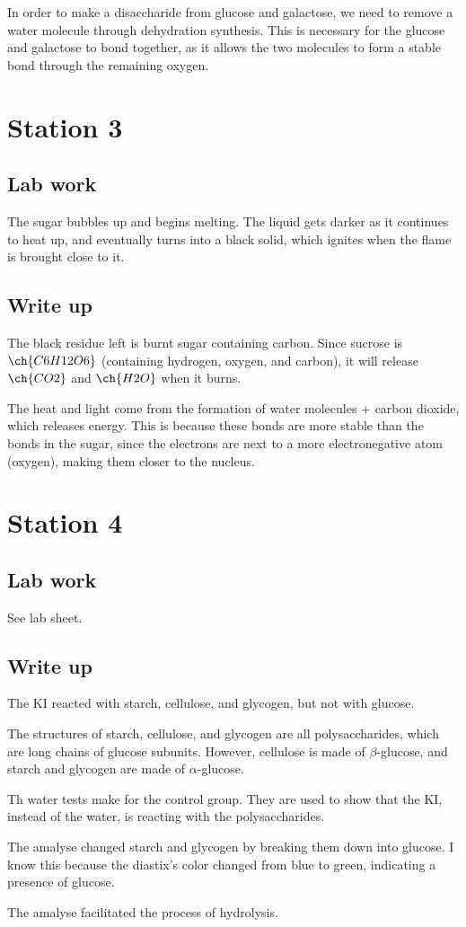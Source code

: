 \documentclass[12pt]{article}
\begin{document}
In order to make a disaccharide from glucose and galactose, we need to remove a water molecule through dehydration synthesis. 
This is necessary for the glucose and galactose to bond together, as it allows the 
two molecules to form a stable bond through the remaining oxygen. 

\section*{Station 3}
\subsection*{Lab work}
The sugar bubbles up and begins melting. The liquid gets darker 
as it continues to heat up, and eventually turns into a black solid, which ignites 
when the flame is brought close to it.

\subsection*{Write up}
The black residue left is burnt sugar containing carbon. 
Since sucrose is $\ch{C6H12O6}$ (containing hydrogen, oxygen, and carbon), 
it will release $\ch{CO2}$ and $\ch{H2O}$ when it burns.

The heat and light come from the formation of water molecules + carbon dioxide, which releases energy. This
is because these bonds are more stable than the bonds in the sugar, since the electrons
are next to a more electronegative atom (oxygen), making them closer to the nucleus.

\section*{Station 4}
\subsection*{Lab work}
See lab sheet.

\subsection*{Write up}
The KI reacted with starch, cellulose, and glycogen, but not with glucose.

The structures of starch, cellulose, and glycogen are all polysaccharides, 
which are long chains of glucose subunits. However, cellulose is made of 
$\beta$-glucose, and starch and glycogen are made of $\alpha$-glucose.

Th water tests make for the control group. They are used to show that
the KI, instead of the water, is reacting with the polysaccharides.

The amalyse changed starch and glycogen by breaking them down into glucose. 
I know this because the diastix's color changed from blue to green, indicating
a presence of glucose. 

The amalyse facilitated the process of hydrolysis. 
\end{document}
